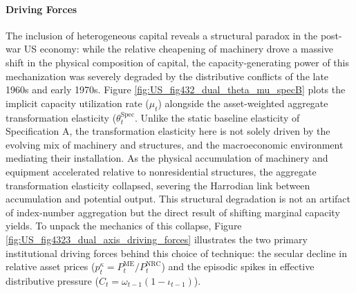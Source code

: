 \paragraph{Driving Forces} The inclusion of heterogeneous capital reveals a structural paradox in the post-war US economy: while the relative cheapening of machinery drove a massive shift in the physical composition of capital, the capacity-generating power of this mechanization was severely degraded by the distributive conflicts of the late 1960s and early 1970s. Figure \ref{fig:US_fig432_dual_theta_mu_specB} plots the implicit capacity utilization rate ($\mu_t$) alongside the asset-weighted aggregate transformation elasticity ($\theta_t^{\text{Spec}}$. Unlike the static baseline elasticity of Specification A, the transformation elasticity here is not solely driven by the evolving mix of machinery and structures, and the macroeconomic environment mediating their installation. As the physical accumulation of machinery and equipment accelerated relative to nonresidential structures, the aggregate transformation elasticity collapsed, severing the Harrodian link between accumulation and potential output. This structural degradation is not an artifact of index-number aggregation but the direct result of shifting marginal capacity yields. To unpack the mechanics of this collapse, Figure \ref{fig:US_fig4323_dual_axis_driving_forces} illustrates the two primary institutional driving forces behind this choice of technique: the secular decline in relative asset prices ($p_t^{\kappa} = P_t^{\text{ME}}/P_t^{\text{NRC}}$) and the episodic spikes in effective distributive pressure ($C_t = \omega_{t-1}(1-\iota_{t-1})$).

